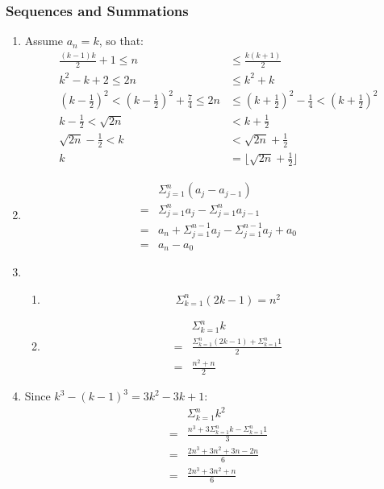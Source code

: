 \documentclass{sig-alternate-05-2015}
\begin{document}
\subsubsection{Sequences and Summations}
\begin{enumerate}
\item Assume $a_n = k$, so that:
\begin{align}
	\frac{(k - 1)k}{2} + 1 \le n & \le \frac{k(k + 1)}{2}\\
	k^2 - k + 2 \le 2n & \le k^2 + k\\
	(k - \frac{1}{2})^2 < (k - \frac{1}{2})^2 + \frac{7}{4} \le 2n & \le (k + \frac{1}{2})^2 - \frac{1}{4} < (k + \frac{1}{2})^2\\
	k - \frac{1}{2} < \sqrt{2n} & < k + \frac{1}{2}\\
	\sqrt{2n} - \frac{1}{2} < k & < \sqrt{2n} + \frac{1}{2}\\
	k & = \lfloor \sqrt{2n} + \frac{1}{2} \rfloor
\end{align}

\item 
\begin{align}
	& \Sigma^n_{j = 1}(a_j - a_{j - 1})\\
	= & \Sigma^n_{j = 1}a_j - \Sigma^n_{j = 1}a_{j - 1}\\
	= & a_n + \Sigma^{n - 1}_{j = 1}a_j - \Sigma^{n - 1}_{j = 1}a_j + a_0\\
	= & a_n - a_0
\end{align}

\item 
\begin{enumerate}
	\item 
	\begin{equation}
		\Sigma^n_{k = 1}(2k - 1) = n^2
	\end{equation}
	
	\item 
	\begin{align}
		& \Sigma^n_{k = 1} k\\
		= & \frac{\Sigma^n_{k = 1}(2k - 1) + \Sigma^n_{k = 1} 1}{2}\\
		= & \frac{n^2 + n}{2}
	\end{align}
\end{enumerate}

\item Since $k^3 - (k - 1)^3 = 3k^2 - 3k + 1$:
\begin{align}
	& \Sigma_{k = 1}^n k^2\\
	= & \frac{n^3 + 3\Sigma_{k = 1}^n k - \Sigma_{k = 1}^n 1}{3}\\
	= & \frac{2n^3 + 3n^2 + 3n - 2n}{6}\\
	= & \frac{2n^3 + 3n^2 + n}{6}
\end{align}
\end{enumerate}
\end{document}
